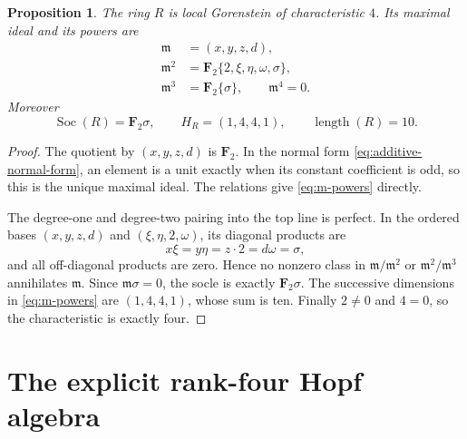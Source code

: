 \documentclass[11pt]{article}
\newtheorem{proposition}[theorem]{Proposition}
\theoremstyle{remark}
\newcommand{\F}{\mathbf F}
\newcommand{\Soc}{\operatorname{Soc}}
\newcommand{\length}{\operatorname{length}}
\newcommand{\m}{\mathfrak m}
\begin{document}
\begin{proposition}\label{prop:base-invariants}
The ring \(R\) is local Gorenstein of characteristic \(4\).  Its maximal
ideal and its powers are
\begin{align}
 \m&=(x,y,z,d),\nonumber\\
 \m^2&=\F_2\{2,\xi,\eta,\omega,\sigma\},\nonumber\\
 \m^3&=\F_2\{\sigma\},\qquad \m^4=0.\label{eq:m-powers}
\end{align}
Moreover
\[
 \Soc(R)=\F_2\sigma,\qquad H_R=(1,4,4,1),
 \qquad \length(R)=10.
\]
\end{proposition}

\begin{proof}
The quotient by \((x,y,z,d)\) is \(\F_2\).  In the normal form
\eqref{eq:additive-normal-form}, an element is a unit exactly when its
constant coefficient is odd, so this is the unique maximal ideal.  The
relations give \eqref{eq:m-powers} directly.

The degree-one and degree-two pairing into the top line is perfect.  In the
ordered bases \((x,y,z,d)\) and \((\xi,\eta,2,\omega)\), its diagonal
products are
\begin{equation}\label{eq:perfect-pairing}
 x\xi=y\eta=z\cdot2=d\omega=\sigma,
\end{equation}
and all off-diagonal products are zero.  Hence no nonzero class in
\(\m/\m^2\) or \(\m^2/\m^3\) annihilates \(\m\).  Since \(\m\sigma=0\),
the socle is exactly \(\F_2\sigma\).  The successive dimensions in
\eqref{eq:m-powers} are \((1,4,4,1)\), whose sum is ten.  Finally \(2\ne0\)
and \(4=0\), so the characteristic is exactly four.
\end{proof}

\section{The explicit rank-four Hopf algebra}\label{sec:hopf}
\end{document}
